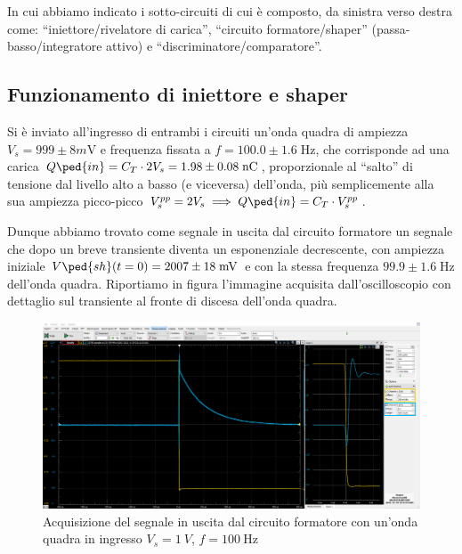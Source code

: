 \documentclass[10pt,a4paper]{article}
\begin{document}
In cui abbiamo indicato i sotto-circuiti di cui è composto, da sinistra verso
destra come: ``iniettore/rivelatore di carica'', ``circuito formatore/shaper''
(passa-basso/integratore attivo) e ``discriminatore/comparatore''.

\subsection{Funzionamento di iniettore e shaper}
Si è inviato all'ingresso di entrambi i circuiti un'onda quadra di
ampiezza $V_s = 999 \pm 8 \si{m\V}$ e frequenza fissata a
$f = 100.0 \pm 1.6 \; \si{\Hz}$, che corrisponde ad una carica
$Q\ped{in} = C_T \cdot 2V_s = 1.98 \pm 0.08 \; \si{n\coulomb}$, proporzionale
al ``salto'' di tensione dal livello alto a basso (e viceversa) dell'onda,
più semplicemente alla sua ampiezza picco-picco
$V_s^{pp} = 2 V_s \implies Q\ped{in} = C_T \cdot V_s^{pp}$.

Dunque abbiamo trovato come segnale in uscita dal circuito formatore un
segnale che dopo un breve transiente diventa un esponenziale decrescente,
con ampiezza iniziale $V\ped{sh} (t=0) = 2007 \pm 18 \; \si{m\V}$ e
con la stessa frequenza $99.9 \pm 1.6 \; \si{\Hz}$ dell'onda quadra.
Riportiamo in figura l'immagine acquisita dall'oscilloscopio con dettaglio
sul transiente al fronte di discesa dell'onda quadra.
\begin{figure}[htbp]
    \centering
	\includegraphics[scale=0.335]{shaperzoom}
    \caption{Acquisizione del segnale in uscita dal circuito formatore con
    un'onda quadra in ingresso $V_s = \SI{1}{V}$, $f= \SI{100}{\Hz}$
    \label{fig: shzoom}}
\end{figure}
\end{document}
